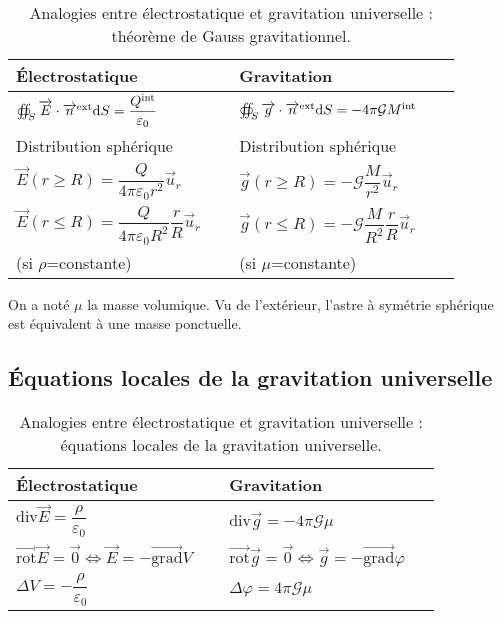     \begin{table}
        \centering
        \begin{tabular}{p{0.45\linewidth}|p{0.45\linewidth}}
            \toprule
            Électrostatique & Gravitation \\ \midrule
            $\oiint_{S}\protect\overrightarrow{{E}}\cdot\protect\overrightarrow{{n}}^{\text{ext}}\mathrm{d} S=\dfrac{Q^{\text{int}}}{\varepsilon_0}$ & $\oiint_{S}\protect\overrightarrow{{g}}\cdot\protect\overrightarrow{{n}}^{\text{ext}}\mathrm{d} S=-4\pi\mathcal{G}M^{\text{int}}$\\ \midrule
            Distribution sphérique & Distribution sphérique \\ \midrule
            $\vec{E}(r\geqslant R)=\dfrac{Q}{4\pi\varepsilon_0 r^{2}}\vec{u}_r$ & $\vec{g}(r\geqslant R)=-\mathcal{G}\dfrac{M}{r^{2}}\vec{u}_r$\\
            $\vec{E}(r\leqslant R)=\dfrac{Q}{4\pi\varepsilon_0 R^{2}}\dfrac{r}{R}\vec{u}_r$ &
            $\vec{g}(r\leqslant R)=-\mathcal{G}\dfrac{M}{R^{2}}\dfrac{r}{R}\vec{u}_r$\\
            (si $\rho$=constante)&(si $\mu$=constante)
            \\ \bottomrule
        \end{tabular}    
        \caption[Théorème de Gauss gravitationnel]{Analogies entre électrostatique et gravitation universelle : théorème de Gauss gravitationnel.}
        \label{tab:analogie_gravitation_universelle_theoreme_gauss_gravitationnel}
    \end{table}

    On a noté $\mu$ la masse volumique. Vu de l'extérieur, l'astre à symétrie sphérique est équivalent à une masse ponctuelle.

    \subsection{Équations locales de la gravitation universelle}

    \begin{table}
        \centering
        \begin{tabular}{p{0.45\linewidth}|p{0.45\linewidth}}
            \toprule
            Électrostatique & Gravitation \\ \midrule
            $\mathrm{div}\vec{E}=\dfrac{\rho}{\varepsilon_0}$ & $\mathrm{div}\vec{g}=-4\pi\mathcal{G}\mu$ \\ \midrule
            $\vec{\mathrm{rot}}\vec{E}=\vec{0}\Leftrightarrow\vec{E}=-\vec{\mathrm{grad}}V$ & $\vec{\mathrm{rot}}\vec{g}=\vec{0}\Leftrightarrow\vec{g}=-\vec{\mathrm{grad}}\varphi$\\ \midrule
            $\Delta V=-\dfrac{\rho}{\varepsilon_0}$ & $\Delta \varphi=4\pi\mathcal{G}\mu$
            \\ \bottomrule
        \end{tabular}    
        \caption[Équations locales de la gravitation universelle]{Analogies entre électrostatique et gravitation universelle : équations locales de la gravitation universelle.}
        \label{tab:analogie_gravitation_universelle_equations_locales_gravitation_universelle}
    \end{table}


